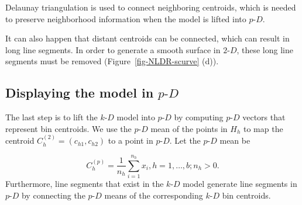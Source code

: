 \documentclass[
  12pt]{article}
\newcommand\pD{$p\text{-}D$}
\newcommand\kD{$k\text{-}D$}
\newcommand\gD{$2\text{-}D$}
\begin{document}
Delaunay triangulation \citep{lee1980} is used to connect neighboring
centroids, which is needed to preserve neighborhood information when the
model is lifted into \pD{}.

It can also happen that distant centroids can be connected, which can
result in long line segments. In order to generate a smooth surface in
\gD{}, these long line segments must be removed
(Figure~\ref{fig-NLDR-scurve} (d)).

\subsection{\texorpdfstring{Displaying the model in
\pD{}}{Displaying the model in }}\label{displaying-the-model-in}

The last step is to lift the \kD{} model into \pD{} by computing \pD{}
vectors that represent bin centroids. We use the \pD{} mean of the
points in \(H_h\) to map the centroid \(C_{h}^{(2)} = (c_{h1}, c_{h2})\)
to a point in \pD{}. Let the \pD{} mean be

\[C_{h}^{(p)} = \frac{1}{n_h}\sum_{i =1}^{n_h} x_i, h = {1, \dots, b; n_h > 0}.\]
Furthermore, line segments that exist in the \kD{} model generate line
segments in \pD{} by connecting the \pD{} means of the corresponding
\kD{} bin centroids.
\end{document}
